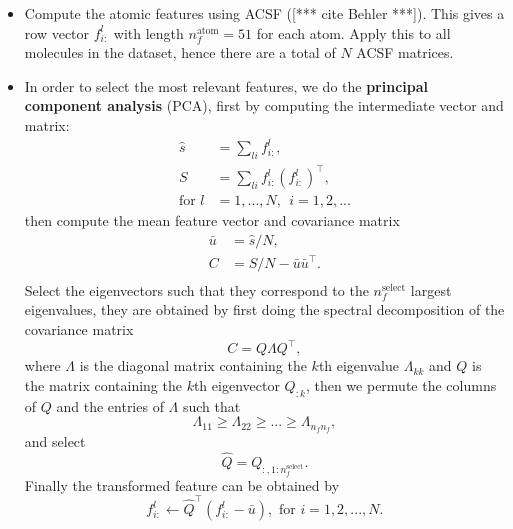 \documentclass[12pt]{article}
\def\att{                    %
        \marginpar[ \hspace*{\fill} \raisebox{-0.2em}{\rule{2mm}{1.2em}} ]
        {\raisebox{-0.2em}{\rule{2mm}{1.2em}} }
        }
\def\at#1{[*** \att #1 ***]}  %
\begin{document}
\begin{itemize}
	\item Compute the atomic features using ACSF (\at{cite Behler}). This gives a row vector $f^l_{i:}$ with length $n^\text{atom}_f = 51$ for each atom. Apply this to all molecules in the dataset, hence there are a total of $N$ ACSF matrices.
	\item In order to select the most relevant features, we do the \textbf{principal component analysis} (PCA), first by computing the intermediate vector and matrix:
	\begin{equation}
		\begin{split}
			\hat{s} &= \sum_{li} f^l_{i:}, \\
			S &= \sum_{li} f^l_{i:} (f^l_{i:})^\top, \\
			\text{for } l &= 1,...,N, ~~ i = 1,2,...
		\end{split}
	\end{equation}
	then compute the mean feature vector and covariance matrix
	\begin{equation}
		\label{eq:pca_atom_start}
		\begin{split}
			\bar{u} &= \hat{s}/N, \\
			C &= S/N - \bar{u}\bar{u}^\top. \\			
		\end{split}
	\end{equation}
	Select the eigenvectors such that they correspond to the $n_f^{\text{select}}$ largest eigenvalues, they are obtained by first doing the spectral decomposition of the covariance matrix
	\begin{equation}
		C = Q\Lambda Q^\top,
	\end{equation}
	where $\Lambda$ is the diagonal matrix containing the $k$th eigenvalue $\Lambda_{kk}$ and $Q$ is the matrix containing the $k$th eigenvector $Q_{:k}$, then we permute the columns of $Q$ and the entries of $\Lambda$ such that
	\begin{equation}
		\Lambda_{11} \geq \Lambda_{22} \geq  ... \geq \Lambda_{n_fn_f},
	\end{equation}
	and select
	\begin{equation}
		\hat{Q} = Q_{:, 1:n_f^{\text{select}}}.
	\end{equation}
	Finally the transformed feature can be obtained by
	\begin{equation}
		\label{eq:pca_atom_end}
		f^l_{i:} \leftarrow \hat{Q}^\top(f^l_{i:} - \bar{u}), \text{ for }i = 1,2,...,N.
	\end{equation}

\end{itemize}
\end{document}
